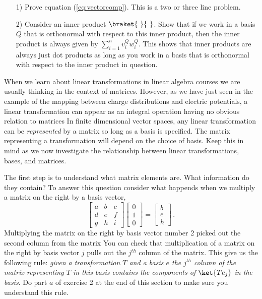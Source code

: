 \begin{itemize}
  \item[1)] Prove equation (\ref{eq:vectorcomp}).  This is a two or three line problem.
  \item[2)] Consider an inner product $\braket{~}{~}$.  Show that if we work in a basis $Q$ that is orthonormal with respect to this inner product, then the inner product is always given by $\sum_{i=1}^n v_i^Q w_i^Q$.  This shows that inner products are always just dot products as long as you work in a basis that is orthonormal with respect to the inner product in question.
\end{itemize}


When we learn about linear transformations in linear algebra courses we are usually thinking in the context of matrices.
However, as we have just seen in the example of the mapping between charge distributions and electric potentials, a linear transformation can appear as an integral operation having no obvious relation to matrices
In finite dimensional vector spaces, any linear transformation can be \emph{represented} by a matrix so long as a basis is specified.
The matrix representing a transformation will depend on the choice of basis.
Keep this in mind as we now investigate the relationship between linear transformations, bases, and matrices.

The first step is to understand what matrix elements are.
What information do they contain?
To answer this question consider what happends when we multiply a matrix on the right by a basis vector,
\begin{displaymath}
  \left[ \begin{array}{ccc} a&b&c\\d&e&f\\g&h&i \end{array} \right] \left[ \begin{array}{c} 0\\1\\0 \end{array} \right] = \left[ \begin{array}{c} b\\e\\h \end{array} \right]
  \,.
\end{displaymath}
Multiplying the matrix on the right by basis vector number 2 picked out the second column from the matrix
You can check that multiplication of a matrix on the right by basis vector $j$ pulls out the $j^{th}$ column of the matrix.
This give us the following rule: \emph{given a transformation $T$ and a basis $e$ the $j^{th}$ column of the matrix representing $T$ in this basis contains the components of $\ket{Te_j}$ in the basis}.
Do part $a$ of exercise 2 at the end of this section to make sure you understand this rule.

